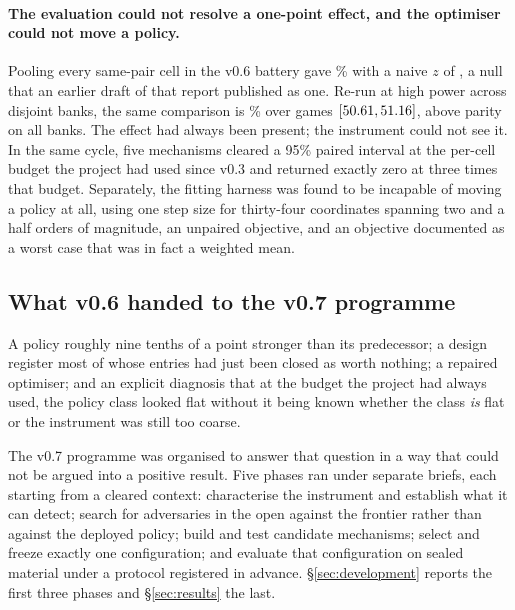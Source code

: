 \paragraph{The evaluation could not resolve a one-point effect, and the optimiser could not move a
policy.} Pooling every same-pair cell in the v0.6 battery gave \vsixHeadPooled\% with a naive $z$ of
\vsixHeadZ{}, a null that an earlier draft of that report published as one. Re-run at high power
across \vsixBigFiveBanks{} disjoint banks, the same comparison is \vsixBigFive\% over
\vsixBigFiveN{} games $[50.61, 51.16]$, above parity on all \vsixBigFiveAbove{}
banks. The effect had always been present; the instrument could not see it. In the same cycle, five
mechanisms cleared a 95\% paired interval at the per-cell budget the project had used since v0.3 and
returned exactly zero at three times that budget. Separately, the fitting harness was found to be
incapable of moving a policy at all, using one step size for thirty-four coordinates spanning two and
a half orders of magnitude, an unpaired objective, and an objective documented as a worst case that
was in fact a weighted mean.

\subsection{What v0.6 handed to the v0.7 programme}
\label{sec:background-handoff}

A policy roughly nine tenths of a point stronger than its predecessor; a design register most of
whose entries had just been closed as worth nothing; a repaired optimiser; and an explicit diagnosis
that at the budget the project had always used, the policy class looked flat without it being known
whether the class \emph{is} flat or the instrument was still too coarse.

The v0.7 programme was organised to answer that question in a way that could not be argued into a
positive result. Five phases ran under separate briefs, each starting from a cleared context:
characterise the instrument and establish what it can detect; search for adversaries in the open
against the \vsix{} frontier rather than against the deployed policy; build and test candidate
mechanisms; select and freeze exactly one configuration; and evaluate that configuration on sealed
material under a protocol registered in advance. \S\ref{sec:development} reports the first three
phases and \S\ref{sec:results} the last.
